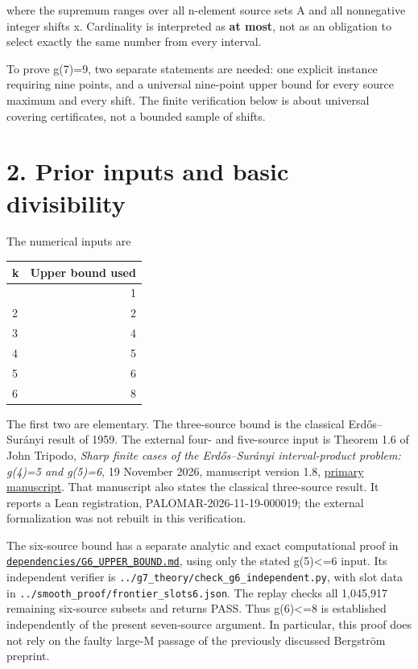 \documentclass[11pt,a4paper]{article}
\begin{document}
where the supremum ranges over all n-element source sets A and all
nonnegative integer shifts x. Cardinality is interpreted as \textbf{at
most}, not as an obligation to select exactly the same number from every
interval.

To prove g(7)=9, two separate statements are needed: one explicit
instance requiring nine points, and a universal nine-point upper bound
for every source maximum and every shift. The finite verification below
is about universal covering certificates, not a bounded sample of
shifts.

\section{2. Prior inputs and basic
divisibility}\label{prior-inputs-and-basic-divisibility}

The numerical inputs are

\begin{longtable}[]{@{}lr@{}}
\toprule\noalign{}
k & Upper bound used \\
\midrule\noalign{}
\endhead
\bottomrule\noalign{}
\endlastfoot
1 & 1 \\
2 & 2 \\
3 & 4 \\
4 & 5 \\
5 & 6 \\
6 & 8 \\
\end{longtable}

The first two are elementary. The three-source bound is the classical
Erdős--Surányi result of 1959. The external four- and five-source input
is Theorem 1.6 of John Tripodo, \emph{Sharp finite cases of the
Erdős--Surányi interval-product problem: g(4)=5 and g(5)=6}, 19 November
2026, manuscript version 1.8,
\href{https://hexagonmath.org/pdf/2611.00694v1}{primary manuscript}.
That manuscript also states the classical three-source result. It
reports a Lean registration, PALOMAR-2026-11-19-000019; the external
formalization was not rebuilt in this verification.

The six-source bound has a separate analytic and exact computational
proof in
\href{dependencies/G6_UPPER_BOUND.md}{\nolinkurl{dependencies/G6_UPPER_BOUND.md}},
using only the stated g(5)\textless=6 input. Its independent verifier is
\nolinkurl{../g7_theory/check_g6_independent.py}, with slot data in
\nolinkurl{../smooth_proof/frontier_slots6.json}. The replay checks all
1,045,917 remaining six-source subsets and returns PASS. Thus
g(6)\textless=8 is established independently of the present seven-source
argument. In particular, this proof does not rely on the faulty large-M
passage of the previously discussed Bergström preprint.
\end{document}
